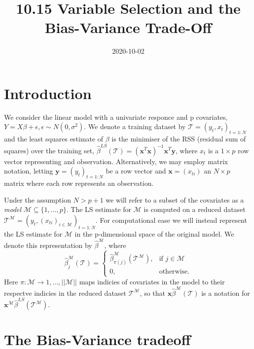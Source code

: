 \documentclass{article}
\title{10.15 Variable Selection and the Bias-Variance Trade-Off }
\date{2020-10-02}
\begin{document}
\maketitle

\section{Introduction}

We consider the linear model with a univariate responce and p covariates, $Y=X\beta + \epsilon, \epsilon \sim N(0,\sigma ^2)$. We denote a training dataset by $\mathcal{T}=(y_t,x_t)_{t=1:N}$ and the least squares estimate of $\beta$ is the minimiser of the RSS (residual sum of squares) over the training set, $\hat{\beta}^{LS}(\mathcal{T})=(\textbf{x}^T\textbf{x})^{-1}\textbf{x}^T\textbf{y}$, where $x_t$ is a $1 \times p$ row vector representing and observation. Alternatively, we may employ
matrix notation, letting $\textbf{y}=(y_t)_{t=1:N}$ be a row vector and $\textbf{x}=(x_{ti})$ an $N \times p$ matrix where each row represents an observation. 

Under the assumption $N>p+1$ we will refer to a subset of the covariates as a \textit{model} $\mathcal{M} \subseteq \{ 1,...,p \}$. The LS estimate for $\mathcal{M}$ is computed on a reduced dataset $\mathcal{T}^{\mathcal{M}}= (y_t,(x_{ti})_{i \in \mathcal{M}})_{t=1:N}$. For computational ease we will instead represent the LS estimate for $\mathcal{M}$ in the p-dimensional space of the original model. We denote this representation by $\hat{\beta}^{\mathcal{M}}$, where 
\begin{equation*}
\hat{\beta}^{\mathcal{M}}_j(\mathcal{T})=
\begin{cases}
\hat{\beta}^{\mathcal{M}}_{\pi(j)}(\mathcal{T}^{\mathcal{M}}), & \text{if } j \in \mathcal{M} \\
0, & \text{otherwise}.
\end{cases}
\end{equation*}
Here $\pi : \mathcal{M} \to {1,...,||\mathcal{M}||}$ maps indicies of covariates in the model to their respectve indicies in the reduced dataset $\mathcal{T}^{\mathcal{M}}$, so that $\textbf{x} \hat{\beta}^{\mathcal{M}}(\mathcal{T})$ is a notation for $\textbf{x}^{\mathcal{M}} \hat{\beta}^{LS} (\mathcal{T}^{\mathcal{M}})$.

\newpage

\section{The Bias-Variance tradeoff}
\end{document}
